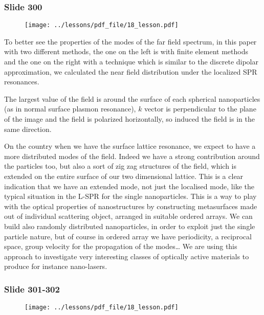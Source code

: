 \documentclass[../main/main.tex]{subfiles}
\begin{document}
\newpage
\subsubsection{Slide 300}

\begin{figure}[h!]
\centering
\texttt{[image: ../lessons/pdf\_file/18\_lesson.pdf]}
\end{figure}

To better see the properties of the modes of the far field spectrum, in this paper with two different methods, the one on the left is with finite element methods and the one on the right with a technique which is similar to the discrete dipolar approximation, we calculated the near field distribution under the localized SPR resonances. 

The largest value of the field is around the surface of each spherical nanoparticles (as in normal surface plasmon resonance), $k$ vector is perpendicular to the plane of the image and the field is polarized horizontally, so induced the field is in the same direction. 

On the country when we have the surface lattice resonance, we expect to have a more distributed modes of the field. Indeed we have a strong contribution around the particles too, but also a sort of zig zag structures of the field, which is extended on the entire surface of our two dimensional lattice. This is a clear indication that we have an extended mode, not just the localised mode, like the typical situation in the L-SPR for the single nanoparticles.
This is a way to play with the optical properties of nanostructures by constructing metasurfaces made out of individual scattering object, arranged in suitable ordered arrays.
We can build also randomly distributed nanoparticles, in order to exploit just the single particle nature, but of course in ordered array we have periodicity, a reciprocal space, group velocity for the propagation of the modes… 
We are using this approach to investigate very interesting classes of optically active materials to produce for instance nano-lasers.

\newpage
\subsubsection{Slide 301-302}

\begin{figure}[h!]
\centering
\texttt{[image: ../lessons/pdf\_file/18\_lesson.pdf]}
\end{figure}
\end{document}
